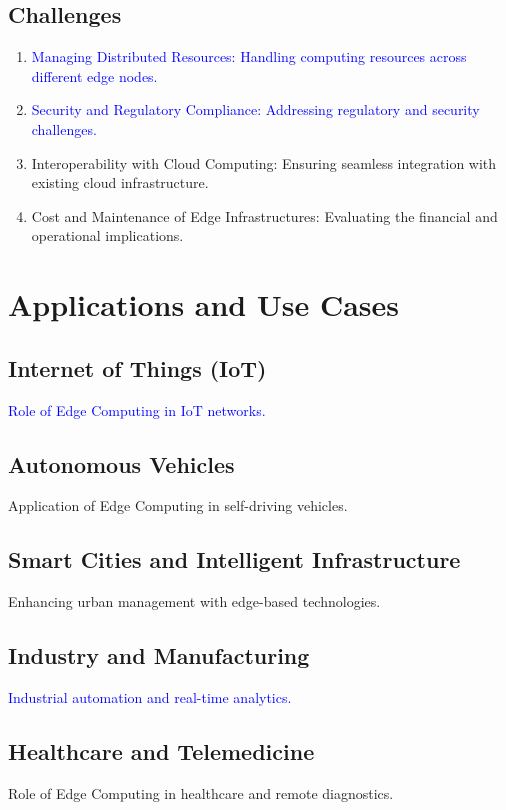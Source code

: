 \documentclass[runningheads]{llncs}
\begin{document}
\subsection{Challenges}
\begin{enumerate}
    \item \textcolor{blue}{Managing Distributed Resources: Handling computing resources across different edge nodes.}
    \item \textcolor{blue}{Security and Regulatory Compliance: Addressing regulatory and security challenges.}
    \item Interoperability with Cloud Computing: Ensuring seamless integration with existing cloud infrastructure.
    \item Cost and Maintenance of Edge Infrastructures: Evaluating the financial and operational implications.
\end{enumerate}

\section{Applications and Use Cases}
\subsection{Internet of Things (IoT)}
\textcolor{blue}{Role of Edge Computing in IoT networks.}

\subsection{Autonomous Vehicles}
Application of Edge Computing in self-driving vehicles.

\subsection{Smart Cities and Intelligent Infrastructure}
Enhancing urban management with edge-based technologies.

\subsection{Industry and Manufacturing}
\textcolor{blue}{Industrial automation and real-time analytics.}

\subsection{Healthcare and Telemedicine}
Role of Edge Computing in healthcare and remote diagnostics.
\end{document}
